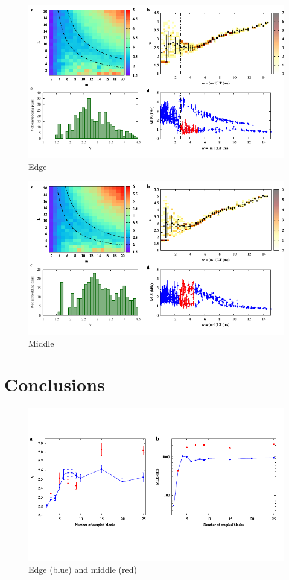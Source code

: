\begin{figure}[H]
    \centering
    \includegraphics[width=\linewidth]{../25_blocks/edge/2e5_points/plots/chaos_low.pdf}
    \caption{Edge}
    \label{fig:25 blocks chaos}
\end{figure}

\begin{figure}[H]
    \centering
    \includegraphics[width=\linewidth]{../25_blocks/middle/2e5_points/plots/chaos_low.pdf}
    \caption{Middle}
    \label{fig:25 blocks chaos middle}
\end{figure}


\section{Conclusions}

\begin{figure}[H]
    \centering
    \includegraphics[width=\linewidth,trim={0 1.5cm 0 1.3cm},clip]
    {../data/nu_mle_blocks.pdf}
    \caption{Edge (blue) and middle (red)}
    \label{fig:nu mle blocks}
\end{figure}
